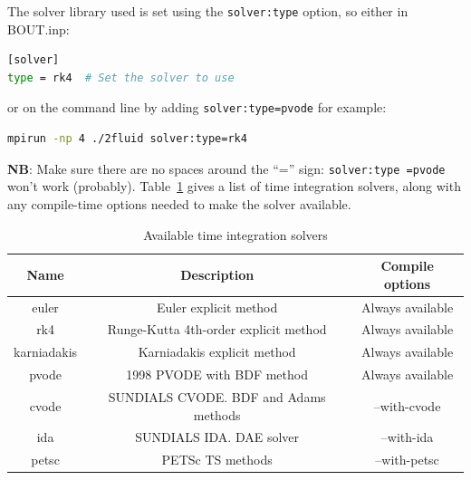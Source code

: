 \documentclass[12pt]{article}
\newcommand{\code}[1]{\texttt{#1}}
\begin{document}
The solver library used is set using the \code{solver:type} option, so either in BOUT.inp:
\begin{lstlisting}[language=bash,numbers=none]
[solver]
type = rk4  # Set the solver to use
\end{lstlisting}
or on the command line by adding \code{solver:type=pvode} for example:
\begin{lstlisting}[language=bash,numbers=none]
mpirun -np 4 ./2fluid solver:type=rk4
\end{lstlisting}
{\bf NB}: Make sure there are no spaces around the ``='' sign: \code{solver:type =pvode} won't work (probably).
Table~\ref{tab:solvers} gives a list of time integration solvers, along with any compile-time
options needed to make the solver available.
\begin{table}[htb!]
\centering
\caption{Available time integration solvers}
\label{tab:solvers}
\begin{tabular}{c | c | c}
\hline
Name & Description & Compile options \\
\hline
euler & Euler explicit method & Always available \\
rk4 & Runge-Kutta 4th-order explicit method & Always available \\
karniadakis & Karniadakis explicit method & Always available \\
pvode & 1998 PVODE with BDF method & Always available \\
cvode & SUNDIALS CVODE. BDF and Adams methods & --with-cvode \\
ida & SUNDIALS IDA. DAE solver & --with-ida \\
petsc & PETSc TS methods & --with-petsc \\
\hline
\end{tabular}
\end{table}
\end{document}
